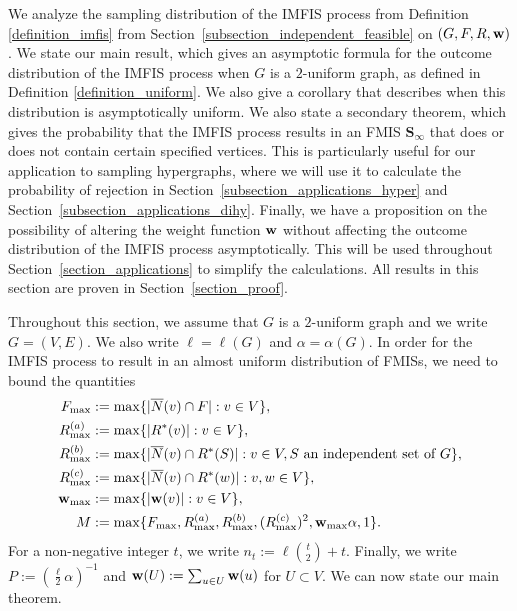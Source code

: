 \documentclass{article}
\theoremstyle{plain}
\theoremstyle{remark}
\theoremstyle{plain}
\numberwithin{equation}{section}
\renewcommand{\b}{{\bf{w}}}
\begin{document}
	
	We analyze the sampling distribution of the IMFIS process from Definition \ref{definition_imfis} from Section~\ref{subsection_independent_feasible} on $(G,F,R,\b)$. We state our main result, which gives an asymptotic formula for the outcome distribution of the IMFIS process when $G$ is a $2$-uniform graph, as defined in Definition \ref{definition_uniform}. We also give a corollary that describes when this distribution is asymptotically uniform. We also state a secondary theorem, which gives the probability that the IMFIS process results in an FMIS $\boldsymbol{S}_{\infty}$ that does or does not contain certain specified vertices. This is particularly useful for our application to sampling hypergraphs, where we will use it to calculate the probability of rejection in Section~\ref{subsection_applications_hyper} and Section~\ref{subsection_applications_dihy}. Finally, we have a proposition on the possibility of altering the weight function $\b$ without affecting the outcome distribution of the IMFIS process asymptotically. This will be used throughout Section~\ref{section_applications} to simplify the calculations. All results in this section are proven in Section~\ref{section_proof}.
	
	Throughout this section, we assume that $G$ is a $2$-uniform graph and we write $G=(V,E)$. We also write $\ell=\ell(G)$ and $\alpha=\alpha(G)$. In order for the IMFIS process to result in an almost uniform distribution of FMISs, we need to bound the quantities
	\begin{align}
		F_{\max}&:=\max\{|\overline{N}(v)\cap F|:v\in V\},
		\\R_{\max}^{(a)}&:=\max\{|R^*(v)|:v\in V\},
		\\R_{\max}^{(b)}&:=\max\{|\overline{N}(v)\cap R^*(S)|:v\in V,S\text{ an independent set of }G\},
		\\R_{\max}^{(c)}&:=\max\{|\overline{N}(v)\cap R^*(w)|:v,w\in V\},
		\\\b_{\max}&:=\max\{|\b(v)|:v\in V\},
		\\M&:=\max\{F_{\max},R_{\max}^{(a)},R_{\max}^{(b)},(R_{\max}^{(c)})^2,\b_{\max}\alpha,1\}.
	\end{align}
	For a non-negative integer $t$, we write $n_t:=\ell\binom{t}{2}+t$. Finally, we write $P:=(\tfrac{\ell}{2}\alpha)^{-1}$ and $\b(U):=\sum_{u\in U}\b(u)$ for $U\subset V$. We can now state our main theorem.
	
\end{document}

